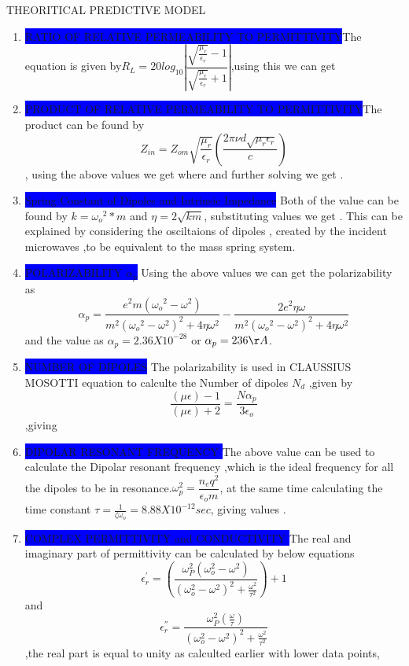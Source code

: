 \documentclass[11pt,aspect ratio=169]{beamer}
\begin{document}
\begin{frame}[t,allowframebreaks]{THEORITICAL PREDICTIVE MODEL}
\begin{enumerate}
		\item \colorbox{blue}{RATIO OF RELATIVE PERMEABILITY TO PERMITTIVITY}The equation is given by$R_L = 20 log_{10} \left \lvert \dfrac{\sqrt{\frac{\mu_r}{\epsilon_r}} - 1}{\sqrt{\frac{\mu_r}{\epsilon_r}} +1 } \right \rvert$,using this we can get 
		\item \colorbox{blue}{PRODUCT OF RELATIVE PERMEABILITY TO PERMITTIVITY}The product can be found by $$Z_{in} = Z_{om}  \sqrt{\frac{\mu_r}{\epsilon_r}} (\dfrac{2 \pi \nu d \sqrt{\mu_r \epsilon_r}}{c})$$,  using the above values we get where  and further solving we get .
		\item \colorbox{blue}{Spring Constant of Dipoles and Intrinsic Impedance} Both of the value can be found by $k = {\omega_o}^2*m$ and $\eta = 2 \sqrt{km}$, substituting values we get . This can be explained by considering the osciltaions of dipoles , created by the incident microwaves ,to be equivalent to the mass spring system.
		\item \colorbox{blue}{POLARIZABILITY $\alpha_p$} Using the above values we can get the polarizability as $${\alpha}_p = \dfrac{e^2 m ({\omega_o}^2 - {\omega}^2)}{m^2({\omega_o}^2 - {\omega}^2)^2 + 4 \eta \omega^2} - \dfrac{2 e^2 \eta \omega}{m^2({\omega_o}^2 - {\omega}^2)^2 + 4 \eta \omega^2}$$ and the value as $\alpha_p = 2.36 X10^{-28}$ or $\alpha_p=236 \AA$.
		\item \colorbox{blue}{NUMBER OF DIPOLES} The polarizability is used in CLAUSSIUS MOSOTTI equation  to calculte the Number of dipoles $N_d$ ,given by $$\dfrac{({\mu \epsilon})- 1}{({\mu \epsilon}) + 2 } = \dfrac{N \alpha_p}{3 \epsilon_o}$$ ,giving 
		\item \colorbox{blue}{DIPOLAR RESONANT FREQUENCY }The above value can be used to calculate the Dipolar resonant frequency ,which is the ideal frequency for all the dipoles to be in resonance.$\omega^2_p = \dfrac{n_e q^2}{\epsilon_o m}$, at the same time calculating the time constant $\tau= \frac{1}{\zeta \omega_o} = 8.88 X 10 ^{-12} sec$, giving values .
		\item \colorbox{blue}{COMPLEX PERMITTIVITY and CONDUCTIVITY }The real and imaginary part of permittivity can be calculated by below equations
		$$\epsilon^{'}_r = (\dfrac{\omega^2_P (\omega^2_o - \omega^2)}{(\omega^2_o - \omega^2)^2 + \frac{\omega^2}{\tau^2}}) + 1 $$ and $$\epsilon^{''}_{r } = \dfrac{\omega^2_P (\frac{\omega}{\tau})}{(\omega^2_o - \omega^2)^2 + \frac{\omega^2}{\tau^2}}$$,the real part is equal to unity as calculted earlier with lower data points, 

\end{enumerate}
\end{frame}
\end{document}
